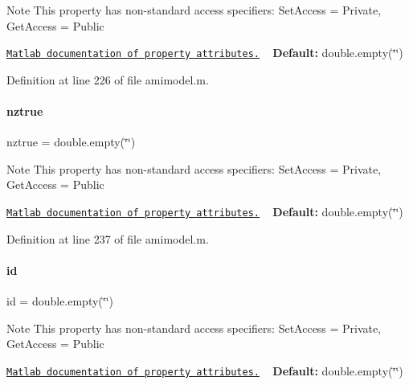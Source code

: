\begin{DoxyNote}{Note}
This property has non-\/standard access specifiers\+: {\ttfamily Set\+Access = Private, Get\+Access = Public} 

\href{http://www.mathworks.com/help/matlab/matlab_oop/property-attributes.html}{\tt Matlab documentation of property attributes.} ~\newline
{\bfseries Default\+:} double.\+empty(\char`\"{}\char`\"{}) 
\end{DoxyNote}


Definition at line 226 of file amimodel.\+m.

\mbox{\label{classamimodel_a364ecd990baeeefd1de3e6795cd50a58}} 
\paragraph{\texorpdfstring{nztrue}{nztrue}}
{\footnotesize\ttfamily nztrue = double.\+empty(\char`\"{}\char`\"{})}

\begin{DoxyNote}{Note}
This property has non-\/standard access specifiers\+: {\ttfamily Set\+Access = Private, Get\+Access = Public} 

\href{http://www.mathworks.com/help/matlab/matlab_oop/property-attributes.html}{\tt Matlab documentation of property attributes.} ~\newline
{\bfseries Default\+:} double.\+empty(\char`\"{}\char`\"{}) 
\end{DoxyNote}


Definition at line 237 of file amimodel.\+m.

\mbox{\label{classamimodel_acf2488b95c97e0378c9bf49de3b50f28}} 
\paragraph{\texorpdfstring{id}{id}}
{\footnotesize\ttfamily id = double.\+empty(\char`\"{}\char`\"{})}

\begin{DoxyNote}{Note}
This property has non-\/standard access specifiers\+: {\ttfamily Set\+Access = Private, Get\+Access = Public} 

\href{http://www.mathworks.com/help/matlab/matlab_oop/property-attributes.html}{\tt Matlab documentation of property attributes.} ~\newline
{\bfseries Default\+:} double.\+empty(\char`\"{}\char`\"{}) 
\end{DoxyNote}


